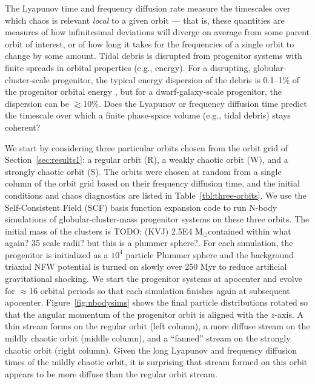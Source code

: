 \documentclass[letterpaper,12pt,preprint]{aastex}
\newcommand{\msun}{\ensuremath{\mathrm{M}_\odot}}
\newcommand{\todo}[2]{{\color{red} TODO: (\MakeUppercase{#1}) #2}}
\begin{document}
The Lyapunov time and frequency diffusion rate measure the timescales over which chaos is relevant \emph{local} to a given orbit --- that is, these quantities are measures of how infinitesimal deviations will diverge on average from some parent orbit of interest, or of how long it takes for the frequencies of a single orbit to change by some amount. Tidal debris is disrupted from progenitor systems with finite spreads in orbital properties (e.g., energy). For a disrupting, globular-cluster-scale progenitor, the typical energy dispersion of the debris is 0.1--1\% of the progenitor orbital energy \citep[assuming masses of $10^4$--$10^5$~\msun;][]{johnston98}, but for a dwarf-galaxy-scale progenitor, the dispersion can be $\gtrsim$10\%. Does the Lyapunov or frequency diffusion time predict the timescale over which a finite phase-space volume (e.g., tidal debris) stays coherent?

We start by considering three particular orbits chosen from the orbit grid of Section~\ref{sec:results1}: a regular orbit (R), a weakly chaotic orbit (W), and a strongly chaotic orbit (S). The orbits were chosen at random from a single column of the orbit grid based on their frequency diffusion time, and the initial conditions and chaos diagnostics are listed in Table~\ref{tbl:three-orbits}. We use the Self-Consistent Field (SCF) basis function expansion code \citep{hernquist92} to run N-body simulations of globular-cluster-mass progenitor systems on these three orbits. The initial mass of the clusters is \todo{kvj}{2.5E4 \msun contained within what again? 35 scale radii? but this is a plummer sphere?}. For each simulation, the progenitor is initialized as a $10^4$ particle Plummer sphere and the background triaxial NFW potential is turned on slowly over 250 Myr to reduce artificial gravitational shocking. We start the progenitor systems at apocenter and evolve for $\approx$16 orbital periods so that each simulation finishes again at subsequent apocenter. Figure~\ref{fig:nbodysims} shows the final particle distributions rotated so that the angular momentum of the progenitor orbit is aligned with the $z$-axis. A thin stream forms on the regular orbit (left column), a more diffuse stream on the mildly chaotic orbit (middle column), and a ``fanned'' stream on the strongly chaotic orbit (right column). Given the long Lyapunov and frequency diffusion times of the mildly chaotic orbit, it is surprising that stream formed on this orbit appears to be more diffuse than the regular orbit stream. 
\end{document}
